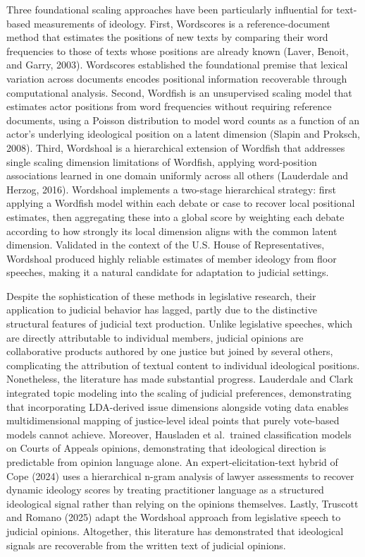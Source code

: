 Three foundational scaling approaches have been particularly influential
for text-based measurements of ideology. First, Wordscores is a
reference-document method that estimates the positions of new texts by
comparing their word frequencies to those of texts whose positions are
already known (Laver, Benoit, and Garry, 2003). Wordscores established
the foundational premise that lexical variation across documents encodes
positional information recoverable through computational analysis.
Second, Wordfish is an unsupervised scaling model that estimates actor
positions from word frequencies without requiring reference documents,
using a Poisson distribution to model word counts as a function of an
actor's underlying ideological position on a latent dimension (Slapin
and Proksch, 2008). Third, Wordshoal is a hierarchical extension of
Wordfish that addresses single scaling dimension limitations of
Wordfish, applying word-position associations learned in one domain
uniformly across all others (Lauderdale and Herzog, 2016). Wordshoal
implements a two-stage hierarchical strategy: first applying a Wordfish
model within each debate or case to recover local positional estimates,
then aggregating these into a global score by weighting each debate
according to how strongly its local dimension aligns with the common
latent dimension. Validated in the context of the U.S. House of
Representatives, Wordshoal produced highly reliable estimates of member
ideology from floor speeches, making it a natural candidate for
adaptation to judicial settings.

Despite the sophistication of these methods in legislative research,
their application to judicial behavior has lagged, partly due to the
distinctive structural features of judicial text production. Unlike
legislative speeches, which are directly attributable to individual
members, judicial opinions are collaborative products authored by one
justice but joined by several others, complicating the attribution of
textual content to individual ideological positions. Nonetheless, the
literature has made substantial progress. Lauderdale and Clark
integrated topic modeling into the scaling of judicial preferences,
demonstrating that incorporating LDA-derived issue dimensions alongside
voting data enables multidimensional mapping of justice-level ideal
points that purely vote-based models cannot achieve. Moreover, Hausladen
et al.~trained classification models on Courts of Appeals opinions,
demonstrating that ideological direction is predictable from opinion
language alone. An expert-elicitation-text hybrid of Cope (2024) uses a
hierarchical n-gram analysis of lawyer assessments to recover dynamic
ideology scores by treating practitioner language as a structured
ideological signal rather than relying on the opinions themselves.
Lastly, Truscott and Romano (2025) adapt the Wordshoal approach from
legislative speech to judicial opinions. Altogether, this literature has
demonstrated that ideological signals are recoverable from the written
text of judicial opinions.

